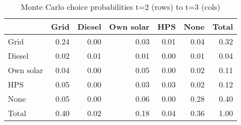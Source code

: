 \begin{table}[!ht]
	\centering
		\caption{Monte Carlo choice probabilities t=2 (rows) to t=3 (cols)}
\begin{tabular}{lrrrrrr}
		\toprule
               &      Grid&    Diesel& Own solar&       HPS&      None&     Total\\
		\midrule
		           Grid&      0.24&      0.00&      0.03&      0.01&      0.04&      0.32\\
		         Diesel&      0.02&      0.01&      0.01&      0.00&      0.01&      0.04\\
		      Own solar&      0.04&      0.00&      0.05&      0.00&      0.02&      0.11\\
		            HPS&      0.05&      0.00&      0.03&      0.03&      0.02&      0.12\\
		           None&      0.05&      0.00&      0.06&      0.00&      0.28&      0.40\\
		          Total&      0.40&      0.02&      0.18&      0.04&      0.36&      1.00\\
		\bottomrule
	\end{tabular}
\end{table}
